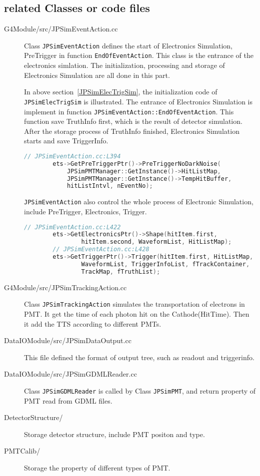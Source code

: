 \subsection{related Classes or code files}
\begin{description}
    \item[G4Module/src/JPSimEventAction.cc] Class \texttt{JPSimEventAction} defines the start of Electronics Simulation, PreTrigger in function \texttt{EndOfEventAction}.
    This class is the entrance of the electronics simlation. The initialization, processing and storage of Electronics Simulation are all done in this part.

    In above section~\ref{JPSimElecTrigSim}, the initialization code of \texttt{JPSimElecTrigSim} is illustrated. The entrance of Electronics Simulation is implement in function \texttt{JPSimEventAction::EndOfEventAction}.
    This function save TruthInfo first, which is the result of detector simulation. After the storage process of TruthInfo finished, Electronics Simulation starts and save TriggerInfo.
    \begin{lstlisting}[language=C++]
        // JPSimEventAction.cc:L394
        ets->GetPreTriggerPtr()->PreTriggerNoDarkNoise(
            JPSimPMTManager::GetInstance()->HitListMap, 
            JPSimPMTManager::GetInstance()->TempHitBuffer, 
            hitListIntvl, nEventNo);
    \end{lstlisting}
    \texttt{JPSimEventAction} also control the whole process of Electronic Simulation, include PreTrigger, Electronics, Trigger.
    
    \begin{lstlisting}[language=C++]
        // JPSimEventAction.cc:L422
        ets->GetElectronicsPtr()->Shape(hitItem.first, 
                hitItem.second, WaveformList, HitListMap);
        // JPSimEventAction.cc:L428
        ets->GetTriggerPtr()->Trigger(hitItem.first, HitListMap, 
                WaveformList, TriggerInfoList, fTrackContainer, 
                TrackMap, fTruthList);
    \end{lstlisting}
    \item[G4Module/src/JPSimTrackingAction.cc] Class \texttt{JPSimTrackingAction} simulates the transportation of electrons in PMT.
    It get the time of each photon hit on the Cathode(HitTime). Then it add the TTS according to different PMTs.
    \item[DataIOModule/src/JPSimDataOutput.cc] This file defined the format of output tree, such as readout and triggerinfo.
    \item[DataIOModule/src/JPSimGDMLReader.cc] Class \texttt{JPSimGDMLReader} is called by Class \texttt{JPSimPMT}, and return property
    of PMT read from GDML files.
    \item[DetectorStructure/] Storage detector structure, include PMT positon and type.
    \item[PMTCalib/] Storage the property of different types of PMT.
\end{description}
